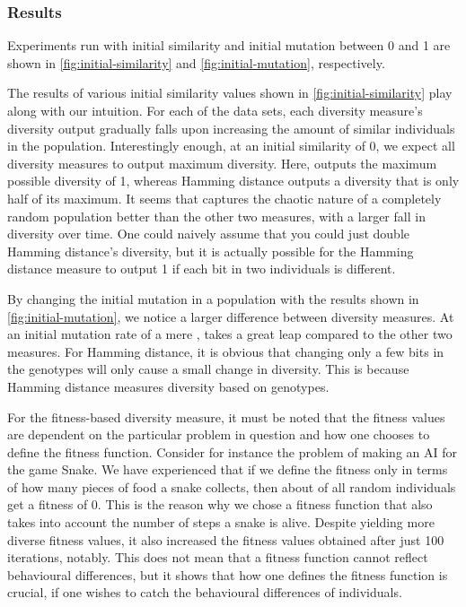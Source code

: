 \subsubsection{Results}
Experiments run with initial similarity and initial mutation between 0 and 1 are shown in \cref{fig:initial-similarity} and \cref{fig:initial-mutation}, respectively.
%

%
The results of various initial similarity values shown in \cref{fig:initial-similarity} play along with our intuition. For each of the data sets, each diversity measure's diversity output gradually falls upon increasing the amount of similar individuals in the population. Interestingly enough, at an initial similarity of 0, we expect all diversity measures to output maximum diversity. Here, \dia{} outputs the maximum possible diversity of 1, whereas Hamming distance outputs a diversity that is only half of its maximum. It seems that \dia{} captures the chaotic nature of a completely random population better than the other two measures, with a larger fall in diversity over time. One could naively assume that you could just double Hamming distance's diversity, but it is actually possible for the Hamming distance measure to output 1 if each bit in two individuals is different.



By changing the initial mutation in a population with the results shown in \cref{fig:initial-mutation}, we notice a larger difference between diversity measures. At an initial mutation rate of a mere , \dia{} takes a great leap compared to the other two measures. For Hamming distance, it is obvious that changing only a few bits in the genotypes will only cause a small change in diversity. This is because Hamming distance measures diversity based on genotypes.

For the fitness-based diversity measure, it must be noted that the fitness values are dependent on the particular problem in question and how one chooses to define the fitness function. Consider for instance the problem of making an AI for the game Snake. We have experienced that if we define the fitness only in terms of how many pieces of food a snake collects, then about  of all random individuals get a fitness of 0. This is the reason why we chose a fitness function that also takes into account the number of steps a snake is alive. Despite yielding more diverse fitness values, it also increased the fitness values obtained after just 100 iterations, notably. This does not mean that a fitness function cannot reflect behavioural differences, but it shows that how one defines the fitness function is crucial, if one wishes to catch the behavioural differences of individuals.
